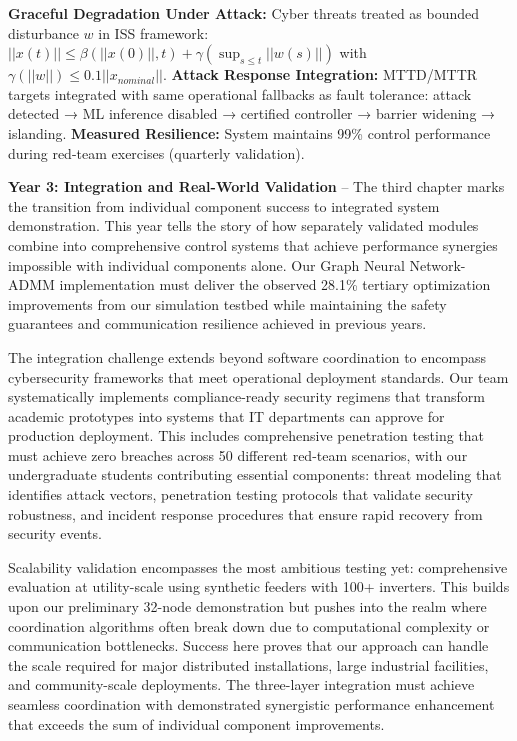 \documentclass[12pt]{article}
\begin{document}
\textbf{Graceful Degradation Under Attack:} Cyber threats treated as bounded disturbance $w$ in ISS framework: $||x(t)|| \leq \beta(||x(0)||, t) + \gamma(\sup_{s \leq t} ||w(s)||)$ with $\gamma(||w||) \leq 0.1||x_{nominal}||$. \textbf{Attack Response Integration:} MTTD/MTTR targets integrated with same operational fallbacks as fault tolerance: attack detected → ML inference disabled → certified controller → barrier widening → islanding. \textbf{Measured Resilience:} System maintains 99\% control performance during red-team exercises (quarterly validation).

\textbf{Year 3: Integration and Real-World Validation} – The third chapter marks the transition from individual component success to integrated system demonstration. This year tells the story of how separately validated modules combine into comprehensive control systems that achieve performance synergies impossible with individual components alone. Our Graph Neural Network-ADMM implementation must deliver the observed 28.1\% tertiary optimization improvements from our simulation testbed while maintaining the safety guarantees and communication resilience achieved in previous years.

The integration challenge extends beyond software coordination to encompass cybersecurity frameworks that meet operational deployment standards. Our team systematically implements compliance-ready security regimens that transform academic prototypes into systems that IT departments can approve for production deployment. This includes comprehensive penetration testing that must achieve zero breaches across 50 different red-team scenarios, with our undergraduate students contributing essential components: threat modeling that identifies attack vectors, penetration testing protocols that validate security robustness, and incident response procedures that ensure rapid recovery from security events.

Scalability validation encompasses the most ambitious testing yet: comprehensive evaluation at utility-scale using synthetic feeders with 100+ inverters. This builds upon our preliminary 32-node demonstration but pushes into the realm where coordination algorithms often break down due to computational complexity or communication bottlenecks. Success here proves that our approach can handle the scale required for major distributed installations, large industrial facilities, and community-scale deployments. The three-layer integration must achieve seamless coordination with demonstrated synergistic performance enhancement that exceeds the sum of individual component improvements.
\end{document}
